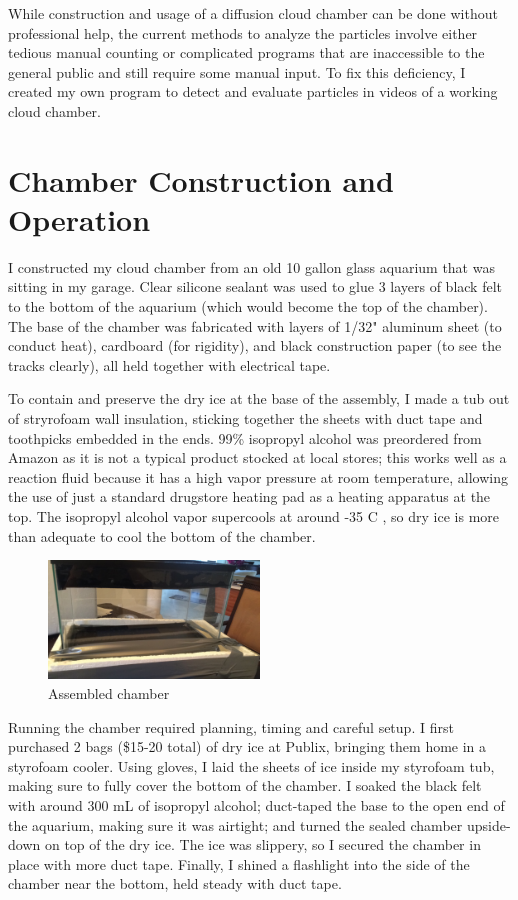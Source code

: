 \documentclass[notitlepage,12pt]{article}
\newcommand{\mycite}[1]{\cite{#1}}
\begin{document}
While construction and usage of a diffusion cloud chamber can be done without professional help, the current methods to analyze the particles involve either tedious manual counting or complicated programs that are inaccessible to the general public and still require some manual input.  To fix this deficiency, I created my own program to detect and evaluate particles in videos of a working cloud chamber.  

\section{Chamber Construction and Operation}

I constructed my cloud chamber from an old 10 gallon glass aquarium that was sitting in my garage. Clear silicone sealant was used to glue 3 layers of black felt to the bottom of the aquarium (which would become the top of the chamber). The base of the chamber was fabricated with layers of 1/32" aluminum sheet (to conduct heat), cardboard (for rigidity), and black construction paper (to see the tracks clearly), all held together with electrical tape.

To contain and preserve the dry ice at the base of the assembly, I made a tub out of stryrofoam wall insulation, sticking together the sheets with duct tape and toothpicks embedded in the ends.  99\% isopropyl alcohol was preordered from Amazon as it is not a typical product stocked at local stores; this works well as a reaction fluid because it has a high vapor pressure at room temperature, allowing the use of just a standard drugstore heating pad as a heating apparatus at the top. The isopropyl alcohol vapor supercools at around -35 \degree{}C \mycite{isopropanol}, so dry ice is more than adequate to cool the bottom of the chamber.

\begin{figure}
\centering
\includegraphics[width=0.5\textwidth]{assembled}
\caption{Assembled chamber\label{fig:assembled}}
\end{figure}

Running the chamber required planning, timing and careful setup. I first purchased 2 bags (\$15-20 total) of dry ice at Publix, bringing them home in a styrofoam cooler. Using gloves, I laid the sheets of ice inside my styrofoam tub, making sure to fully cover the bottom of the chamber. I soaked the black felt with around 300 mL of isopropyl alcohol; duct-taped the base to the open end of the aquarium, making sure it was airtight; and turned the sealed chamber upside-down on top of the dry ice. The ice was slippery, so I secured the chamber in place with more duct tape. Finally, I shined a flashlight into the side of the chamber near the bottom, held steady with duct tape.
\end{document}
